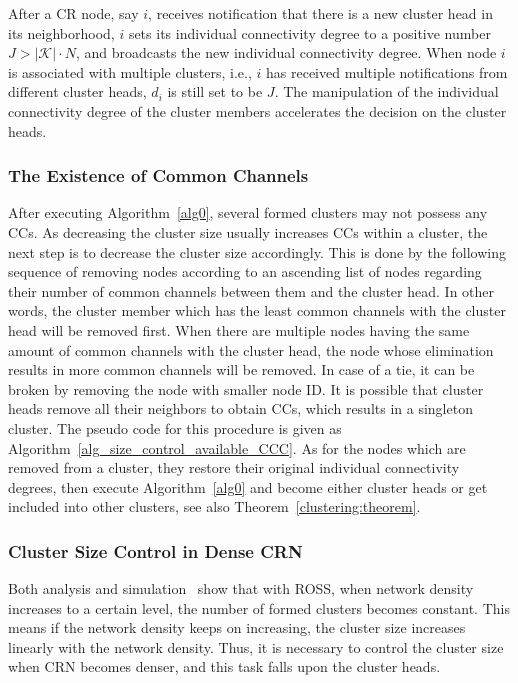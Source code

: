 \documentclass[times]{ettauth}
\newcommand{\ie}{i.e., }
\theoremstyle{mytheoremstyle}
\theoremstyle{mytheoremstyle}
\theoremstyle{mytheoremstyle}
\begin{document}
After a CR node, say $i$, receives notification that there is a new cluster head in its neighborhood, $i$ sets its individual connectivity degree to a positive number $J > |\mathcal{K}| \cdot N$, and broadcasts the new individual connectivity degree. 
When node $i$ is associated with multiple clusters, \ie $i$ has received multiple notifications from different cluster heads, $d_i$ is still set to be $J$. 
The manipulation of the individual connectivity degree of the cluster members accelerates the decision on the cluster heads.





\subsubsection{The Existence of Common Channels}
\label{ross_p1_guarantee_ccc}
After executing Algorithm~\ref{alg0}, several formed clusters may not possess any CCs.
As decreasing the cluster size usually increases CCs within a cluster, the next step is to decrease the cluster size accordingly.
This is done by the following sequence of removing nodes according to an ascending list of nodes regarding their number of common channels between them and the cluster head. 
In other words, the cluster member which has the least common channels with the cluster head will be removed first.
When there are multiple nodes having the same amount of common channels with the cluster head, the node whose elimination results in more common channels will be removed.
In case of a tie, it can be broken by removing the node with smaller node ID.
It is possible that cluster heads remove all their neighbors to obtain CCs, which results in a singleton cluster.
The pseudo code for this procedure is given as Algorithm~\ref{alg_size_control_available_CCC}.
As for the nodes which are removed from a cluster, they restore their original individual connectivity degrees, then execute Algorithm~\ref{alg0} and become either cluster heads or get included into other clusters, see also Theorem~\ref{clustering:theorem}.


\subsubsection{Cluster Size Control in Dense CRN}
\label{ross_p2_cluster_pruning}

Both analysis and simulation~\cite{2017arXiv170404828L} show that with ROSS, when network density increases to a certain level, the number of formed clusters becomes constant.
This means if the network density keeps on increasing, the cluster size increases linearly with the network density.
Thus, it is necessary to control the cluster size when CRN becomes denser, and this task falls upon the cluster heads.
\end{document}

